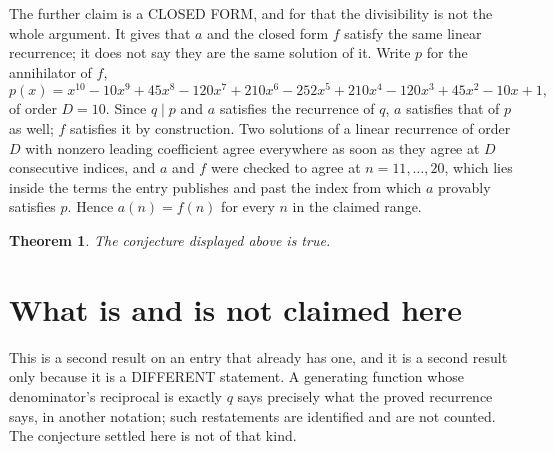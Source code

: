 \documentclass[11pt,a4paper]{article}
\theoremstyle{plain}
\newtheorem{theorem}{Theorem}
\theoremstyle{definition}
\begin{document}
The further claim is a CLOSED FORM, and for that the divisibility is not the whole argument. It
gives that $a$ and the closed form $f$ satisfy the same linear recurrence; it does not say they
are the same solution of it. Write $p$ for the annihilator of $f$,
\[
  p(x)=x^{10} - 10 x^{9} + 45 x^{8} - 120 x^{7} + 210 x^{6} - 252 x^{5} + 210 x^{4} - 120 x^{3} + 45 x^{2} - 10 x + 1 ,
\]
of order $D=10$. Since $q\mid p$ and $a$ satisfies the recurrence of $q$, $a$ satisfies that of
$p$ as well; $f$ satisfies it by construction. Two solutions of a linear recurrence of order $D$
with nonzero leading coefficient agree everywhere as soon as they agree at $D$ consecutive
indices, and $a$ and $f$ were checked to agree at $n=11,\dots,20$,
which lies inside the terms the entry publishes and past the index from which $a$ provably
satisfies $p$. Hence $a(n)=f(n)$ for every $n$ in the claimed range.

\begin{theorem}
The conjecture displayed above is true.
\end{theorem}

\section{What is and is not claimed here}

This is a second result on an entry that already has one, and it is a second result only because
it is a DIFFERENT statement. A generating function whose denominator's reciprocal is exactly $q$
says precisely what the proved recurrence says, in another notation; such restatements are
identified and are not counted. The conjecture settled here is not of that kind.
\end{document}
